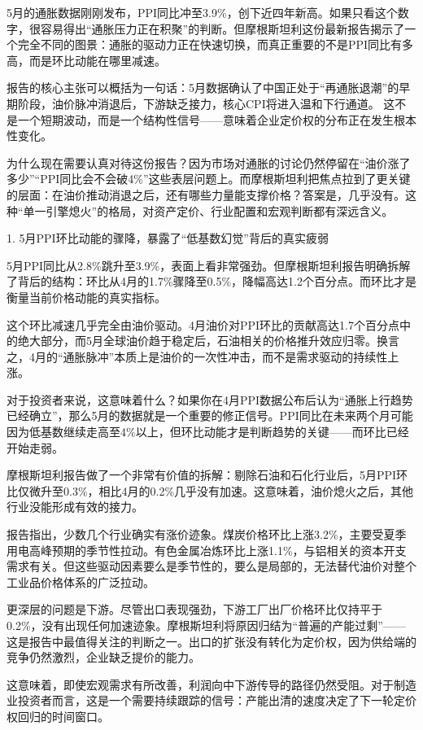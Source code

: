 \documentclass[11pt]{ctexart}
\begin{document}
5月的通胀数据刚刚发布，PPI同比冲至3.9\%，创下近四年新高。如果只看这个数字，很容易得出“通胀压力正在积聚”的判断。但摩根斯坦利这份最新报告揭示了一个完全不同的图景：通胀的驱动力正在快速切换，而真正重要的不是PPI同比有多高，而是环比动能在哪里减速。

报告的核心主张可以概括为一句话：5月数据确认了中国正处于“再通胀退潮”的早期阶段，油价脉冲消退后，下游缺乏接力，核心CPI将进入温和下行通道。 这不是一个短期波动，而是一个结构性信号——意味着企业定价权的分布正在发生根本性变化。

为什么现在需要认真对待这份报告？因为市场对通胀的讨论仍然停留在“油价涨了多少”“PPI同比会不会破4\%”这些表层问题上。而摩根斯坦利把焦点拉到了更关键的层面：在油价推动消退之后，还有哪些力量能支撑价格？答案是，几乎没有。这种“单一引擎熄火”的格局，对资产定价、行业配置和宏观判断都有深远含义。

1. 5月PPI环比动能的骤降，暴露了“低基数幻觉”背后的真实疲弱

5月PPI同比从2.8\%跳升至3.9\%，表面上看非常强劲。但摩根斯坦利报告明确拆解了背后的结构：环比从4月的1.7\%骤降至0.5\%，降幅高达1.2个百分点。而环比才是衡量当前价格动能的真实指标。

这个环比减速几乎完全由油价驱动。4月油价对PPI环比的贡献高达1.7个百分点中的绝大部分，而5月全球油价趋于稳定后，石油相关的价格推升效应归零。换言之，4月的“通胀脉冲”本质上是油价的一次性冲击，而不是需求驱动的持续性上涨。

对于投资者来说，这意味着什么？如果你在4月PPI数据公布后认为“通胀上行趋势已经确立”，那么5月的数据就是一个重要的修正信号。PPI同比在未来两个月可能因为低基数继续走高至4\%以上，但环比动能才是判断趋势的关键——而环比已经开始走弱。

摩根斯坦利报告做了一个非常有价值的拆解：剔除石油和石化行业后，5月PPI环比仅微升至0.3\%，相比4月的0.2\%几乎没有加速。这意味着，油价熄火之后，其他行业没能形成有效的接力。

报告指出，少数几个行业确实有涨价迹象。煤炭价格环比上涨3.2\%，主要受夏季用电高峰预期的季节性拉动。有色金属冶炼环比上涨1.1\%，与铝相关的资本开支需求有关。但这些驱动因素要么是季节性的，要么是局部的，无法替代油价对整个工业品价格体系的广泛拉动。

更深层的问题是下游。尽管出口表现强劲，下游工厂出厂价格环比仅持平于0.2\%，没有出现任何加速迹象。摩根斯坦利将原因归结为“普遍的产能过剩”——这是报告中最值得关注的判断之一。出口的扩张没有转化为定价权，因为供给端的竞争仍然激烈，企业缺乏提价的能力。

这意味着，即使宏观需求有所改善，利润向中下游传导的路径仍然受阻。对于制造业投资者而言，这是一个需要持续跟踪的信号：产能出清的速度决定了下一轮定价权回归的时间窗口。
\end{document}
